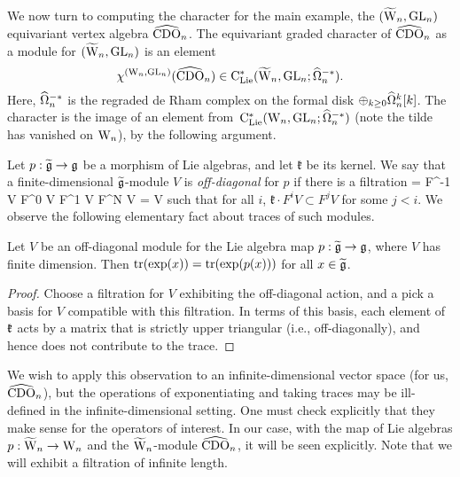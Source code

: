 \subsubsection{} 

We now turn to computing the character for the main example, the $(\widetilde{{{\rm W}}}_n,{\rm GL}_n)$
equivariant vertex algebra $\widehat{\rm CDO}_n$. 
The equivariant graded character of $\widehat{\rm CDO}_n$ as a module for $(\widetilde{{{\rm W}}}_n, {\rm GL}_n)$ is an element 
\[
\chi^{({{\rm W}_n}, {\rm GL}_n)} (\widehat{\rm CDO}_n) \in {\rm C}_{{\rm Lie}}^*(\widetilde{{{\rm W}}}_n , {\rm GL}_n ; \widehat{\Omega}^{-*}_n). 
\]
Here, $\widehat{\Omega}^{-*}_n$ is the regraded de Rham complex on the formal disk $\oplus_{k \geq 0} \widehat{\Omega}^k_n [k]$. 
The character is the image of an element from~${\rm C}_{{\rm Lie}}^*({{\rm W}_n} , {\rm GL}_n ; \widehat{\Omega}^{-*}_n)$ (note the tilde has vanished on ${{\rm W}_n}$),
by the following argument.

Let $p : \widetilde{\mathfrak g} \to \mathfrak g$ be a morphism of Lie algebras, and let $\mathfrak{k}$ be its kernel. 
We say that a finite-dimensional $\widetilde{\mathfrak g}$-module $V$ is {\em off-diagonal} for $p$ if there is a filtration 
 = F^{-1} V \subset F^0 V \subset F^1 V \subset \cdots \subset F^N V = V
\een
such that for all $i$, $\mathfrak{k} \cdot F^i V \subset F^{j} V$ for some $j < i$. We observe the following elementary fact about traces of such modules.

\begin{lemma} 
Let $V$ be an off-diagonal module for the Lie algebra map $p : \widetilde{\mathfrak g} \to \mathfrak g$,
where $V$ has finite dimension. 
Then ${\rm tr}(\exp(x)) = \operatorname{tr}(\exp(p(x)))$ for all $x \in \widetilde{\mathfrak g}$. 
\end{lemma}

\begin{proof} 
Choose a filtration for $V$ exhibiting the off-diagonal action, and a pick a basis for $V$ compatible with this filtration. 
In terms of this basis, each element of $\frak{k}$ acts by a matrix that is strictly upper triangular (i.e., off-diagonally), and hence does not contribute to the trace. 
\end{proof}

We wish to apply this observation to an infinite-dimensional vector space (for us, $\widehat{\rm CDO}_n$),
but the operations of exponentiating and taking traces may be ill-defined in the infinite-dimensional setting.
One must check explicitly that they make sense for the operators of interest.
In our case, with the map of Lie algebras $p : \widetilde{{{\rm W}}}_n \to {{\rm W}_n}$ and the $\widetilde{{{\rm W}}}_n$-module $\widehat{\rm CDO}_n$,
it will be seen explicitly.
Note that we will exhibit a filtration of infinite length.
 
